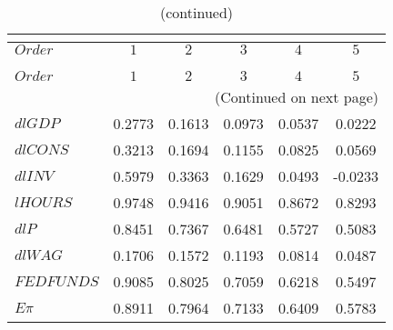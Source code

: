  
\begin{center}
\begin{longtable}{lccccc} 
\caption{COEFFICIENTS OF AUTOCORRELATION}\\
 \label{Table:th_autocorr_matrix}\\
\toprule 
$Order       $	 & 	 $         1$	 & 	 $         2$	 & 	 $         3$	 & 	 $         4$	 & 	 $         5$\\
\midrule \endfirsthead 
\caption{(continued)}\\
 \toprule \\ 
$Order       $	 & 	 $         1$	 & 	 $         2$	 & 	 $         3$	 & 	 $         4$	 & 	 $         5$\\
\midrule \endhead 
\midrule \multicolumn{6}{r}{(Continued on next page)} \\ \bottomrule \endfoot 
\bottomrule \endlastfoot 
${dlGDP}     $	 & 	    0.2773	 & 	    0.1613	 & 	    0.0973	 & 	    0.0537	 & 	    0.0222 \\ 
${dlCONS}    $	 & 	    0.3213	 & 	    0.1694	 & 	    0.1155	 & 	    0.0825	 & 	    0.0569 \\ 
${dlINV}     $	 & 	    0.5979	 & 	    0.3363	 & 	    0.1629	 & 	    0.0493	 & 	   -0.0233 \\ 
${lHOURS}    $	 & 	    0.9748	 & 	    0.9416	 & 	    0.9051	 & 	    0.8672	 & 	    0.8293 \\ 
${dlP}       $	 & 	    0.8451	 & 	    0.7367	 & 	    0.6481	 & 	    0.5727	 & 	    0.5083 \\ 
${dlWAG}     $	 & 	    0.1706	 & 	    0.1572	 & 	    0.1193	 & 	    0.0814	 & 	    0.0487 \\ 
${FEDFUNDS}  $	 & 	    0.9085	 & 	    0.8025	 & 	    0.7059	 & 	    0.6218	 & 	    0.5497 \\ 
${E\pi}      $	 & 	    0.8911	 & 	    0.7964	 & 	    0.7133	 & 	    0.6409	 & 	    0.5783 \\ 
\end{longtable}
 \end{center}
